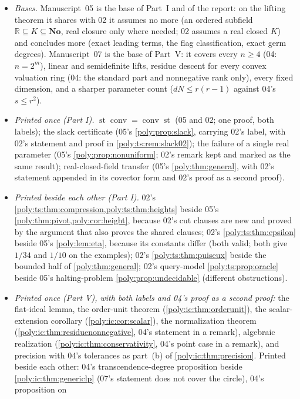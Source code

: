 \documentclass[11pt,a4paper]{article}
\numberwithin{equation}{section}
\theoremstyle{plain}
\newcommand{\No}{\mathbf{No}}
\newcommand{\R}{\mathbb R}
\newcommand{\st}{\operatorname{st}}
\newcommand{\conv}{\operatorname{conv}}
\begin{document}
\begin{itemize}
\item \emph{Bases.} Manuscript~05 is the base of Part~I and of the report: on
the lifting theorem it shares with 02 it assumes no more (an ordered
subfield $\R\subseteq K\subseteq\No$, real closure only where needed; 02
assumes a real closed $K$) and concludes more (exact leading terms, the
flag classification, exact germ degrees). Manuscript~07 is the base of Part~V: it covers every
$n\ge4$ (04: $n=2^m$), linear and semidefinite lifts, residue descent for
every convex valuation ring (04: the standard part and nonnegative rank
only), every fixed dimension, and a sharper parameter count
($dN\le r(r-1)$ against 04's $s\le r^2$).
\item \emph{Printed once (Part I).} $\st\conv=\conv\st$ (05 and 02; one
proof, both labels); the slack certificate (05's
\cref{poly:prop:slack}, carrying 02's label, with 02's statement and proof
in \cref{poly:ts:rem:slack02}); the failure of a single real parameter (05's
\cref{poly:prop:nonuniform}; 02's remark kept and marked as the same
result); real-closed-field transfer (05's \cref{poly:thm:general}, with 02's
statement appended in its covector form and 02's proof as a second proof).
\item \emph{Printed beside each other (Part I).} 02's
\cref{poly:ts:thm:compression,poly:ts:thm:heights} beside 05's
\cref{poly:thm:pivot,poly:cor:height}, because 02's cut clauses are new and
proved by the argument that also proves the shared clauses; 02's
\cref{poly:ts:thm:epsilon} beside 05's \cref{poly:lem:eta}, because its
constants differ (both valid; both give $1/34$ and $1/10$ on the examples);
02's \cref{poly:ts:thm:puiseux} beside the bounded half of
\cref{poly:thm:general}; 02's query-model \cref{poly:ts:prop:oracle} beside
05's halting-problem \cref{poly:prop:undecidable} (different obstructions).
\item \emph{Printed once (Part V), with both labels and 04's
proof as a second proof:} the flat-ideal lemma, the order-unit theorem
(\cref{poly:ic:thm:orderunit}), the scalar-extension corollary
(\cref{poly:ic:cor:scalar}), the normalization theorem
(\cref{poly:ic:thm:residuenonnegative}, 04's statement in a remark),
algebraic realization (\cref{poly:ic:thm:conservativity}, 04's point case in
a remark), and precision with 04's tolerances as part~(b) of
\cref{poly:ic:thm:precision}. Printed beside each other: 04's
transcendence-degree proposition beside \cref{poly:ic:thm:genericlp}
(07's statement does not cover the circle), 04's proposition on

\end{itemize}
\end{document}
